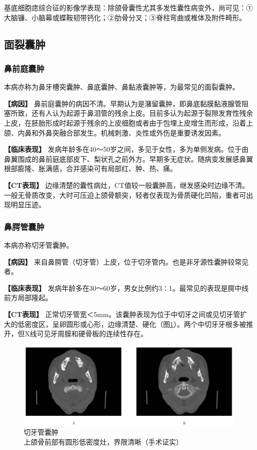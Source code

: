 基底细胞痣综合征的影像学表现：除颌骨囊性尤其多发性囊性病变外，尚可见：①大脑镰、小脑幕或蝶鞍韧带钙化；②肋骨分叉；③脊柱弯曲或椎体及附件畸形。

\subsection{面裂囊肿}

\subsubsection{鼻前庭囊肿}

本病亦称为鼻牙槽突囊肿、鼻底囊肿、鼻黏液囊肿等，为最常见的面裂囊肿。

\textbf{【病因】}
鼻前庭囊肿的病因不清。早期认为是潴留囊肿，即鼻底黏膜黏液腺管阻塞所致，还有人认为起源于鼻泪管的残余上皮。目前多认为起源于裂隙发育性残余上皮，在胚胎形成时起源于残余的上皮细胞或者由于包埋上皮增生而形成，沿着上颌、内鼻和外鼻突融合部发生。机械刺激、炎性或外伤是重要诱发因素。

\textbf{【临床表现】}
发病年龄多在40～50岁之间，多见于女性，多为单侧发病。位于由鼻翼围成的鼻前庭底部皮下、梨状孔之前外方。早期多无症状。随病变发展感鼻翼根部膨隆、胀满感，合并感染可有局部红、肿、热、痛。

\textbf{【CT表现】}
边缘清楚的囊性病灶，CT值较一般囊肿高，继发感染时边缘不清。一般无骨质改变，大时可压迫上颌骨额突，轻者仅表现为骨质硬化凹陷，重者可出现明显压迹。

\subsubsection{鼻腭管囊肿}

本病亦称切牙管囊肿。

\textbf{【病因】}
来自鼻腭管（切牙管）上皮，位于切牙管内。也是非牙源性囊肿较常见者。

\textbf{【临床表现】}
发病年龄多在30～60岁，男女比例约3∶1。最常见的表现是腭中线前方局部隆起。

\textbf{【CT表现】}
正常切牙管宽＜5mm。该囊肿表现为位于中切牙之间或见切牙管扩大的低密度区，呈卵圆形或心形，边缘清楚、硬化（图\ref{fig7-3}）。两个中切牙牙根多被推开，但X线可见牙周膜和硬骨板的连续性存在。

\begin{figure}[!htbp]
 \centering
 \includegraphics[width=.7\textwidth,height=\textheight,keepaspectratio]{./images/Image00157.jpg}
 \captionsetup{justification=centering}
 \caption{切牙管囊肿\\{\small 上颌骨前部有圆形低密度灶，界限清晰（手术证实）}}
 \label{fig7-3}
  \end{figure} 

